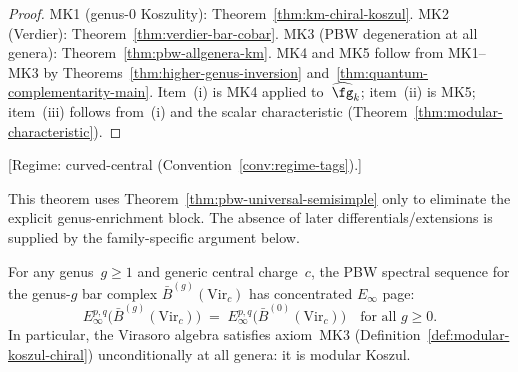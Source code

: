 \begin{proof}
MK1 (genus-$0$ Koszulity):
Theorem~\ref{thm:km-chiral-koszul}.
MK2 (Verdier):
Theorem~\ref{thm:verdier-bar-cobar}.
MK3 (PBW degeneration at all genera):
Theorem~\ref{thm:pbw-allgenera-km}.
MK4 and MK5 follow from MK1--MK3 by
Theorems~\ref{thm:higher-genus-inversion}
and~\ref{thm:quantum-complementarity-main}.
Item~(i) is MK4 applied to~$\widehat{\fg}_k$;
item~(ii) is MK5;
item~(iii) follows from~(i) and the
scalar characteristic
(Theorem~\ref{thm:modular-characteristic}).
\end{proof}

\begin{theorem}
\label{thm:pbw-allgenera-virasoro}
\textup{[Regime: curved-central
\textup{(}Convention~\textup{\ref{conv:regime-tags})}.]}

This theorem uses Theorem~\ref{thm:pbw-universal-semisimple} only to eliminate
the explicit genus-enrichment block.  The absence of later differentials/extensions
is supplied by the family-specific argument below.

For any genus~$g \geq 1$ and generic central charge~$c$, the PBW
spectral sequence for the genus-$g$ bar complex
$\bar{B}^{(g)}(\mathrm{Vir}_c)$ has concentrated
$E_\infty$ page:
\[
E_\infty^{p,q}\bigl(\bar{B}^{(g)}(\mathrm{Vir}_c)\bigr)
\;=\;
E_\infty^{p,q}\bigl(\bar{B}^{(0)}(\mathrm{Vir}_c)\bigr)
\quad \text{for all } g \geq 0.
\]
In particular, the Virasoro algebra satisfies axiom~\textup{MK3}
\textup{(}Definition~\textup{\ref{def:modular-koszul-chiral})}
unconditionally at all genera: it is modular Koszul.
\end{theorem}

